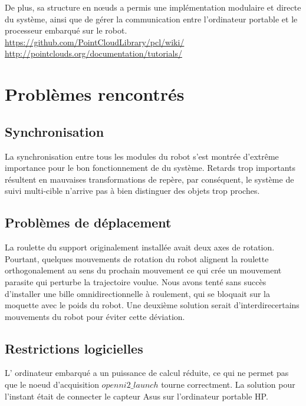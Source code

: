 De plus, sa structure en nœuds a permis une implémentation modulaire et directe du système, ainsi que de gérer la communication entre l'ordinateur portable et le processeur embarqué sur le robot. \\

\url{https://github.com/PointCloudLibrary/pcl/wiki/} \\

\url{http://pointclouds.org/documentation/tutorials/} \\

\chapter{Problèmes rencontrés}

\section{Synchronisation}

La synchronisation entre tous les modules du robot s'est montrée d'extrême importance pour le bon fonctionnement de du système. Retards trop importants résultent en mauvaises transformations de repère, par conséquent, le système de suivi multi-cible n'arrive pas à bien distinguer des objets trop proches. 

\section{Problèmes de déplacement}

La roulette du support originalement installée avait deux axes de
rotation. Pourtant, quelques mouvements de rotation du robot alignent
la roulette orthogonalement au sens du prochain mouvement ce qui crée
un mouvement parasite qui perturbe la trajectoire voulue. Nous avons tenté sans succès d'installer une bille omnidirectionnelle à roulement, qui se
bloquait sur la moquette avec le poids du robot. Une deuxième solution serait d'interdirecertains mouvements du robot pour éviter cette déviation.

\section{Restrictions logicielles}
L' ordinateur embarqué a un puissance de calcul réduite, ce qui ne permet pas que le noeud d'acquisition \(openni2\_launch\) tourne correctment. La solution pour l'instant était de connecter le capteur Asus sur l'ordinateur portable HP.

